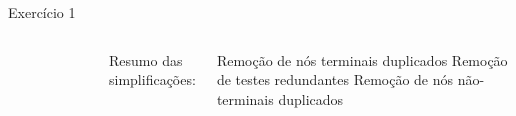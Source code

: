 \expandafter\documentclass\expandafter[table, usenames, svgnames, dvipsnames,14pt, \classopts]{beamer}
\begin{document}
\begin{frame}{Exercício 1}
\begin{columns}[c]
\begin{figure}
            \end{figure}

            
            {\small
                Resumo das simplificações:
                {\scriptsize
                    \begin{outline}
                        \1[\textbf{C1}.] Remoção de nós terminais duplicados
                        \1[\textbf{C2}.] Remoção de testes redundantes
                        \1[\textbf{C3}.] Remoção de nós não-terminais duplicados
                    \end{outline}
                }
            }
    
    \end{columns}
    
\end{frame}
\end{document}
